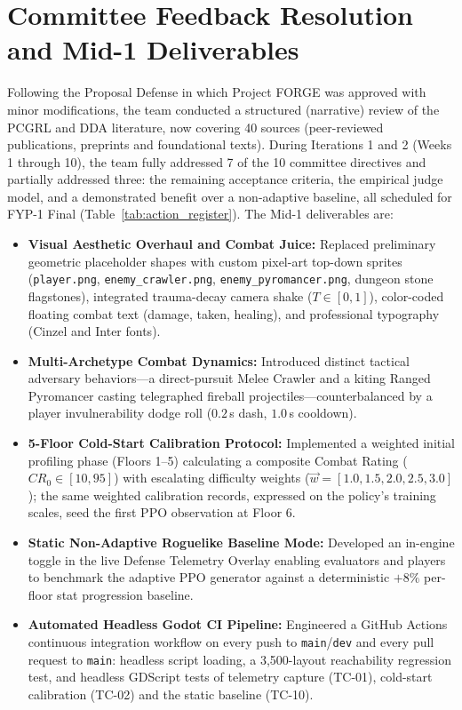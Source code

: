 \section*{Committee Feedback Resolution and Mid-1 Deliverables}
Following the Proposal Defense in which Project FORGE was approved with minor modifications, the team conducted a structured (narrative) review of the PCGRL and DDA literature, now covering 40 sources (peer-reviewed publications, preprints and foundational texts). During Iterations 1 and 2 (Weeks 1 through 10), the team fully addressed 7 of the 10 committee directives and partially addressed three: the remaining acceptance criteria, the empirical judge model, and a demonstrated benefit over a non-adaptive baseline, all scheduled for FYP-1 Final (Table~\ref{tab:action_register}). The Mid-1 deliverables are:
\begin{itemize}
    \item \textbf{Visual Aesthetic Overhaul and Combat Juice:} Replaced preliminary geometric placeholder shapes with custom pixel-art top-down sprites (\texttt{player.png}, \texttt{enemy\_crawler.png}, \texttt{enemy\_pyromancer.png}, dungeon stone flagstones), integrated trauma-decay camera shake ($T \in [0, 1]$), color-coded floating combat text (damage, taken, healing), and professional typography (Cinzel and Inter fonts).
    \item \textbf{Multi-Archetype Combat Dynamics:} Introduced distinct tactical adversary behaviors---a direct-pursuit Melee Crawler and a kiting Ranged Pyromancer casting telegraphed fireball projectiles---counterbalanced by a player invulnerability dodge roll ($0.2$\,s dash, $1.0$\,s cooldown).
    \item \textbf{5-Floor Cold-Start Calibration Protocol:} Implemented a weighted initial profiling phase (Floors 1--5) calculating a composite Combat Rating ($CR_0 \in [10, 95]$) with escalating difficulty weights ($\vec{w} = [1.0, 1.5, 2.0, 2.5, 3.0]$); the same weighted calibration records, expressed on the policy's training scales, seed the first PPO observation at Floor 6.
    \item \textbf{Static Non-Adaptive Roguelike Baseline Mode:} Developed an in-engine toggle in the live Defense Telemetry Overlay enabling evaluators and players to benchmark the adaptive PPO generator against a deterministic $+8\%$ per-floor stat progression baseline.
    \item \textbf{Automated Headless Godot CI Pipeline:} Engineered a GitHub Actions continuous integration workflow on every push to \texttt{main}/\texttt{dev} and every pull request to \texttt{main}: headless script loading, a 3,500-layout reachability regression test, and headless GDScript tests of telemetry capture (TC-01), cold-start calibration (TC-02) and the static baseline (TC-10).
\end{itemize}

